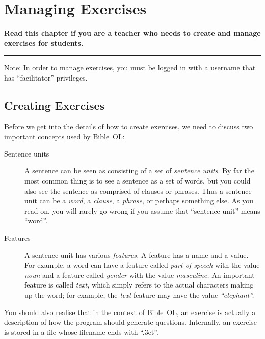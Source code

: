 \documentclass[11pt,oneside,a4paper]{memoir}
\begin{document}

\chapter{Managing Exercises}

\textbf{Read this chapter if you are a teacher who needs to create and manage exercises for students.}
\plainbreak{3}

Note: In order to manage exercises, you must be logged in with a username that has ``facilitator''
privileges.


\section{Creating Exercises}

Before we get into the details of how to create exercises, we need to discuss two important concepts
used by Bible~OL:

\begin{description}
\item[Sentence units] A sentence can be seen as consisting of a set of \emph{sentence units}. By far
  the most common thing is to see a sentence as a set of words, but you could also see the sentence
  as comprised of clauses or phrases. Thus a sentence unit can be a \emph{word}, a \emph{clause}, a
  \emph{phrase}, or perhaps something else. As you read on, you will rarely go wrong if you assume
  that ``sentence unit'' means ``word''.
\item[Features] A sentence unit has various \emph{features.} A feature has a name and a value. For
  example, a word can have a feature called \emph{part of speech} with the value \emph{noun} and a
  feature called \emph{gender} with the value \emph{masculine.} An important feature is called \emph{text,}
  which simply refers to the actual characters making up the word; for example, the \emph{text} feature may
  have the value \emph{``elephant''.}
\end{description}

You should also realise that in the context of Bible~OL, an exercise is actually a description of
how the program should generate questions. Internally, an exercise is stored in a file whose
filename ends with ``.3et''.
\end{document}
